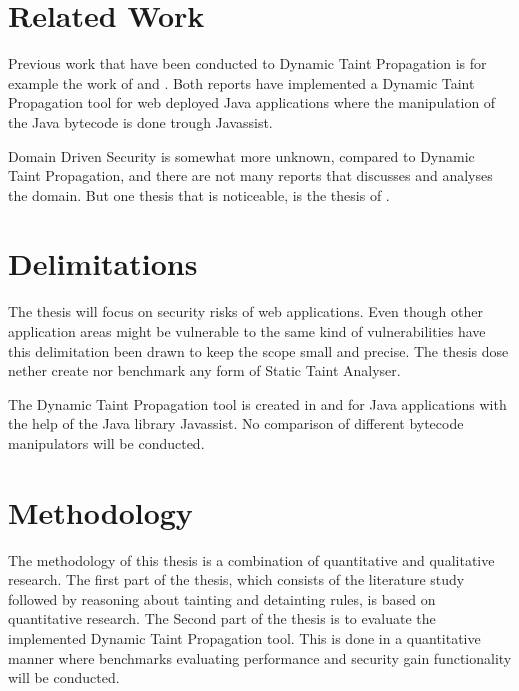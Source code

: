 \section{Related Work}
Previous work that have been conducted to Dynamic Taint Propagation is for example the work of \textcite{Haldar} and \textcite{Zhao2016}. Both reports have implemented a Dynamic Taint Propagation tool for web deployed Java applications where the manipulation of the Java bytecode is done trough Javassist.

Domain Driven Security is somewhat more unknown, compared to Dynamic Taint Propagation, and there are not many reports that discusses and analyses the domain. But one thesis that is noticeable, is the thesis of \textcite{Stendahl2016}.


\section{Delimitations}
The thesis will focus on security risks of web applications. Even though other application areas might be vulnerable to the same kind of vulnerabilities have this delimitation been drawn to keep the scope small and precise. The thesis dose nether create nor benchmark any form of Static Taint Analyser. 

The Dynamic Taint Propagation tool is created in and for Java applications with the help of the Java library Javassist. No comparison of different bytecode manipulators will be conducted.

\section{Methodology}
The methodology of this thesis is a combination of quantitative and qualitative research. The first part of the thesis, which consists of the literature study followed by reasoning about tainting and detainting rules, is based on quantitative research. The Second part of the thesis is to evaluate the implemented Dynamic Taint Propagation tool. This is done in a quantitative manner where benchmarks evaluating performance and security gain functionality will be conducted.
